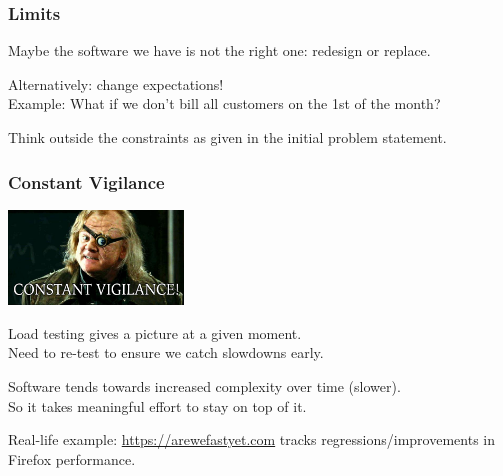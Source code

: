 \begin{frame}
\frametitle{Limits}

Maybe the software we have is not the right one: redesign or replace.

Alternatively: change expectations!\\
\quad Example: What if we don't bill all customers on the 1st of the month?

Think outside the constraints as given in the initial problem statement.

\end{frame}

\begin{frame}
\frametitle{Constant Vigilance}

\begin{center}
  \includegraphics[width=0.35\textwidth]{images/constantvigilance.png}
\end{center}

Load testing gives a picture at a given moment.\\
\quad Need to re-test to ensure we catch slowdowns early.

Software tends towards increased complexity over time (slower).\\
\quad So it takes meaningful effort to stay on top of it.

Real-life example: \url{https://arewefastyet.com} tracks regressions/improvements in Firefox performance.

\end{frame}

